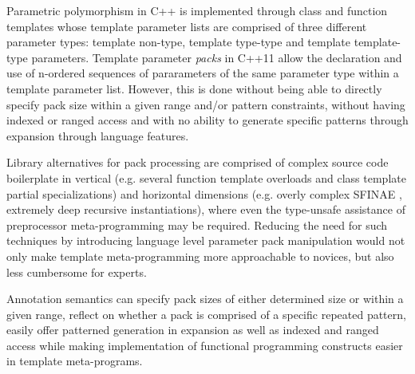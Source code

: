 
\p Parametric polymorphism in C++ is implemented through class and function templates whose template parameter lists are comprised of three different parameter types: template non-type, template type-type and template template-type parameters.
Template parameter \textit{packs} in C++11 \cite{cpp11} allow the declaration and use of n-ordered sequences of pararameters of the same parameter type within a template parameter list.
However, this is done without being able to directly specify pack size within a given range and/or pattern constraints, without having indexed or ranged access and with no ability to generate specific patterns through expansion through language features.

\p Library alternatives for pack processing are comprised of complex source code boilerplate in vertical (e.g. several function template overloads and class template partial specializations) and horizontal dimensions (e.g. overly complex SFINAE \cite{sfinae,JarviWL03}, extremely deep recursive instantiations), where even the type-unsafe assistance of preprocessor meta-programming may be required.
Reducing the need for such techniques by introducing language level parameter pack manipulation would not only make template meta-programming more approachable to novices, but also less cumbersome for experts.

\p Annotation semantics can specify pack sizes of either determined size or within a given range, reflect on whether a pack is comprised of a specific repeated pattern, easily offer patterned generation in expansion as well as indexed and ranged access while making implementation of functional programming constructs easier in template meta-programs.
